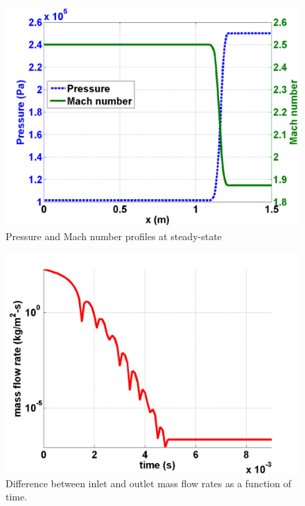         \begin{figure}[H]%
                \centering
                \includegraphics[scale=.50]{figures/mach_number_pressure.png}
                \caption{Pressure and Mach number profiles at steady-state}
                \label{fig:2d_corner_isomach}
        \end{figure}        
        \begin{figure}[H]%
                \centering
                \includegraphics[scale=.50]{figures/CompressionCorner2DQ.png}
                \caption{Difference between inlet and outlet mass flow rates as a function of time.}
                \label{fig:2d_convergence}
        \end{figure}
